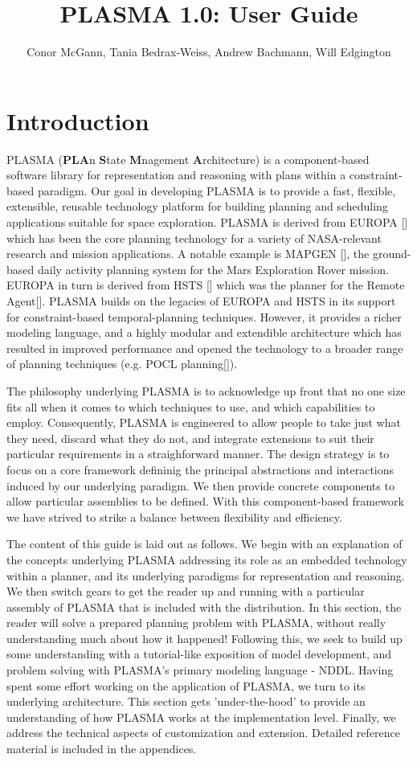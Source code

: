 \documentclass[10pt, letterpaper, twoside]{article}
\author{Conor McGann, Tania Bedrax-Weiss, Andrew Bachmann, Will Edgington}
\title{PLASMA 1.0: User Guide}
\begin{document}
\maketitle

\section{Introduction}
PLASMA ({\bf PLA}n {\bf S}tate {\bf M}nagement {\bf A}rchitecture) is
a component-based software library for representation and reasoning
with plans within a constraint-based paradigm. Our goal in developing
PLASMA is to provide a fast, flexible, extensible, reusable technology
platform for building planning and scheduling applications suitable
for space exploration. PLASMA is derived from EUROPA [] which has been
the core planning technology for a variety of NASA-relevant research
and mission applications. A notable example is MAPGEN [], the
ground-based daily activity planning system for the Mars Exploration
Rover mission. EUROPA in turn is derived from HSTS [] which was the
planner for the Remote Agent[]. PLASMA builds on the legacies of
EUROPA and HSTS in its support for constraint-based temporal-planning
techniques. However, it provides a richer modeling language, and a
highly modular and extendible architecture which has resulted in
improved performance and opened the technology to a broader range of
planning techniques (e.g. POCL planning[]).

The philosophy underlying PLASMA is to acknowledge up front that no
one size fits all when it comes to which techniques to use, and which
capabilities to employ. Consequently, PLASMA is engineered to allow
people to take just what they need, discard what they do not, and
integrate extensions to suit their particular requirements in a
straighforward manner. The design strategy is to focus on a core
framework defininig the principal abstractions and interactions
induced by our underlying paradigm. We then provide concrete
components to allow particular assemblies to be defined. With this
component-based framework we have strived to strike a balance between
flexibility and efficiency.

The content of this guide is laid out as follows. We begin with an
explanation of the concepts underlying PLASMA addressing its role as
an embedded technology within a planner, and its underlying paradigms
for representation and reasoning. We then switch gears to get the
reader up and running with a particular assembly of PLASMA that is
included with the distribution. In this section, the reader will solve
a prepared planning problem with PLASMA, without really understanding
much about how it happened! Following this, we seek to build up some
understanding with a tutorial-like exposition of model development,
and problem solving with PLASMA's primary modeling language -
NDDL. Having spent some effort working on the application of PLASMA,
we turn to its underlying architecture. This section gets
'under-the-hood' to provide an understanding of how PLASMA works at
the implementation level.  Finally, we address the technical aspects
of customization and extension. Detailed reference material is
included in the appendices.
\end{document}
